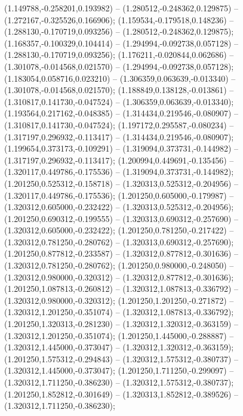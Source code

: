  (1.149788,-0.258201,0.193982) -- (1.280512,-0.248362,0.129875) -- (1.272167,-0.325526,0.166906);
 (1.159534,-0.179518,0.148236) -- (1.288130,-0.170719,0.093256) -- (1.280512,-0.248362,0.129875);
 (1.168357,-0.100329,0.104414) -- (1.294994,-0.092738,0.057128) -- (1.288130,-0.170719,0.093256);
 (1.176211,-0.020844,0.062686) -- (1.301078,-0.014568,0.021570) -- (1.294994,-0.092738,0.057128);
 (1.183054,0.058716,0.023210) -- (1.306359,0.063639,-0.013340) -- (1.301078,-0.014568,0.021570);
 (1.188849,0.138128,-0.013861) -- (1.310817,0.141730,-0.047524) -- (1.306359,0.063639,-0.013340);
 (1.193564,0.217162,-0.048385) -- (1.314434,0.219546,-0.080907) -- (1.310817,0.141730,-0.047524);
 (1.197172,0.295587,-0.080234) -- (1.317197,0.296932,-0.113417) -- (1.314434,0.219546,-0.080907);
 (1.199654,0.373173,-0.109291) -- (1.319094,0.373731,-0.144982) -- (1.317197,0.296932,-0.113417);
 (1.200994,0.449691,-0.135456) -- (1.320117,0.449786,-0.175536) -- (1.319094,0.373731,-0.144982);
 (1.201250,0.525312,-0.158718) -- (1.320313,0.525312,-0.204956) -- (1.320117,0.449786,-0.175536);
 (1.201250,0.605000,-0.179987) -- (1.320312,0.605000,-0.232422) -- (1.320313,0.525312,-0.204956);
 (1.201250,0.690312,-0.199555) -- (1.320313,0.690312,-0.257690) -- (1.320312,0.605000,-0.232422);
 (1.201250,0.781250,-0.217422) -- (1.320312,0.781250,-0.280762) -- (1.320313,0.690312,-0.257690);
 (1.201250,0.877812,-0.233587) -- (1.320312,0.877812,-0.301636) -- (1.320312,0.781250,-0.280762);
 (1.201250,0.980000,-0.248050) -- (1.320312,0.980000,-0.320312) -- (1.320312,0.877812,-0.301636);
 (1.201250,1.087813,-0.260812) -- (1.320312,1.087813,-0.336792) -- (1.320312,0.980000,-0.320312);
 (1.201250,1.201250,-0.271872) -- (1.320312,1.201250,-0.351074) -- (1.320312,1.087813,-0.336792);
 (1.201250,1.320313,-0.281230) -- (1.320312,1.320312,-0.363159) -- (1.320312,1.201250,-0.351074);
 (1.201250,1.445000,-0.288887) -- (1.320312,1.445000,-0.373047) -- (1.320312,1.320312,-0.363159);
 (1.201250,1.575312,-0.294843) -- (1.320312,1.575312,-0.380737) -- (1.320312,1.445000,-0.373047);
 (1.201250,1.711250,-0.299097) -- (1.320312,1.711250,-0.386230) -- (1.320312,1.575312,-0.380737);
 (1.201250,1.852812,-0.301649) -- (1.320313,1.852812,-0.389526) -- (1.320312,1.711250,-0.386230);
